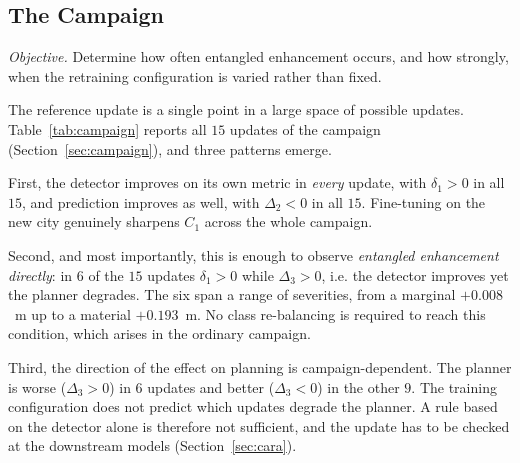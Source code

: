 \documentclass[conference]{IEEEtran}
\begin{document}
\subsection{The Campaign}
\label{sec:res-campaign}
\emph{Objective.} Determine how often entangled enhancement occurs, and how
strongly, when the retraining configuration is varied rather than fixed.

The reference update is a single point in a large space of possible updates.
Table~\ref{tab:campaign} reports all $15$ updates of the campaign
(Section~\ref{sec:campaign}), and three patterns emerge.

First, the detector improves on its own metric in \emph{every} update, with
$\delta_1 > 0$ in all $15$, and prediction improves as well, with $\Delta_2 < 0$
in all $15$. Fine-tuning on the new city genuinely sharpens $C_1$ across the whole
campaign.

Second, and most importantly, this is enough to observe \emph{entangled
enhancement directly}: in $6$ of the $15$ updates $\delta_1 > 0$ while
$\Delta_3 > 0$, i.e. the detector improves yet the planner degrades. The six span
a range of severities, from a marginal $+0.008$~m up to a material $+0.193$~m. No
class re-balancing is required to reach this condition, which arises in the ordinary
campaign.

Third, the direction of the effect on planning is campaign-dependent. The
planner is worse ($\Delta_3 > 0$) in $6$ updates and better ($\Delta_3 < 0$) in
the other $9$. The training configuration does not predict which updates degrade
the planner. A rule based on the detector alone is therefore not sufficient, and
the update has to be checked at the downstream models (Section~\ref{sec:cara}).
\end{document}
